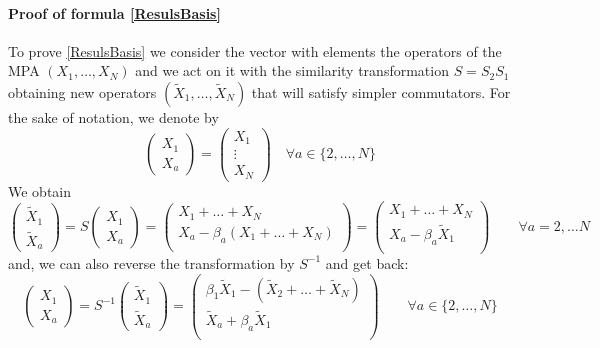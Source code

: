 \documentclass[10pt]{article}
\numberwithin{equation}{section}
\numberwithin{equation}{subsection}
\newcommand{\Xt}{\tilde{X}}
\begin{document}
\paragraph{Proof of formula \eqref{ResulsBasis}} 
To prove \eqref{ResulsBasis} we consider the vector with elements the operators of the MPA $(X_{1},\ldots,X_{N})$ and we act on it with the similarity transformation $S=S_{2}S_{1}$ obtaining new operators $(\Xt_{1},\ldots,\Xt_{N})$ that will satisfy simpler commutators. 
For the sake of notation, we denote by 
\begin{equation}
    \begin{pmatrix}
		X_{1}\\ 
		X_{a}
	\end{pmatrix}=\begin{pmatrix}
	    X_{1}\\
     \vdots\\
     X_{N}
	\end{pmatrix}\quad \forall a\in \{2,\ldots,N\}
\end{equation}
We obtain 
\begin{equation}\label{Xtildes2b}
	\begin{pmatrix}
		\Xt_{1}\\ 
		\Xt_{a}
	\end{pmatrix} =S\begin{pmatrix}
		X_{1}\\X_{a}
	\end{pmatrix}=\begin{pmatrix} 
		X_{1}+\ldots +X_{N}\\
		X_{a}-\beta_{a}(X_{1}+\ldots+X_{N})\\ 
	\end{pmatrix}=\begin{pmatrix} 
		X_{1}+\ldots +X_{N}\\
		X_{a}-\beta_{a}\Xt_{1}\\ 
	\end{pmatrix}\qquad \forall a=2,\ldots N
\end{equation}
and, we can also reverse the transformation by $S^{-1}$ and get back: 
\begin{equation}\label{Xes}
	\begin{pmatrix}
		X_{1}\\
		X_{a} 
	\end{pmatrix} =S^{-1}\begin{pmatrix}
		\widetilde{X}_{1}\\
		\widetilde{X}_{a}
	\end{pmatrix}=\begin{pmatrix}
		\beta_1\Xt_{1}-(\Xt_{2}+\ldots+\Xt_{N})\\
		\Xt_{a}+\beta_{a}\Xt_{1}\\ 
	\end{pmatrix}\qquad\forall a\in \{2,\ldots,N\}
\end{equation}
\end{document}
